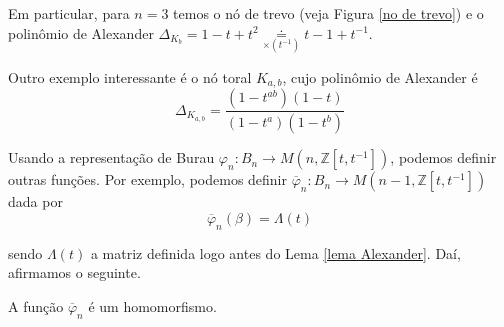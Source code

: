 	\par\vspace{0.3cm} Em particular, para $n = 3$ temos o nó de trevo (veja Figura \eqref{no de trevo}) e o polinômio de Alexander $\Delta_{K_b} = 1-t+t^2\underset{\times(t^{-1})}{\doteq} t-1+t^{-1}$.
	\par\vspace{0.3cm} Outro exemplo interessante é o nó toral $K_{a,b}$, cujo polinômio de Alexander é
	\begin{equation*}
	\Delta_{K_{a,b}} = \frac{(1-t^{ab})(1-t)}{(1-t^a)(1-t^b)}
	\end{equation*}
	\par\vspace{0.3cm} Usando a representação de Burau $\varphi_n: B_n\to M(n, \mathbb{Z}[t,t^{-1}])$, podemos definir outras funções. Por exemplo, podemos definir $\overline{\varphi}_n: B_n\to M(n-1, \mathbb{Z}[t,t^{-1}])$ dada por
	\begin{equation*}
	\overline{\varphi}_n(\beta) = \Lambda(t)
	\end{equation*} 
	\par\vspace{0.3cm} sendo $\Lambda(t)$ a matriz definida logo antes do Lema \eqref{lema Alexander}. Daí, afirmamos o seguinte.
	\begin{prop}
		\label{parecido com Burau}
		A função $\overline{\varphi}_n$ é um homomorfismo. %
	\end{prop}
